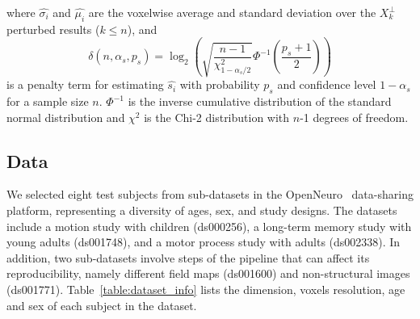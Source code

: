 \documentclass[lettersize,journal]{IEEEtran}
\begin{document}
{where $\hat{\sigma_i}$ and $\hat{\mu_i}$ are the voxelwise average and standard deviation over the $X_k^\perp$ perturbed results ($k \leq n$), and
\begin{equation}
  \delta(n, \alpha_s, p_s) = \log_2 \left( \sqrt{\frac{n-1}{\chi^2_{1-\alpha_s/2}}} \Phi^{-1} \left( \frac{p_s+1}{2} \right) \right)
\end{equation}
is a penalty term for estimating $\hat{s_i}$ with probability $p_s$ and confidence level $1-\alpha_s$ for a sample size $n$.
$\Phi^{-1}$ is the inverse cumulative distribution of the standard normal distribution and $\chi^2$ is the Chi-2 distribution with $n$-1 degrees of freedom.


\subsection{Data}
\label{subsec:data}

We selected eight test subjects from sub-datasets in the OpenNeuro~\cite{markiewicz2021openneuro} data-sharing platform, representing a diversity of ages, sex, and study designs. The datasets include a motion study with children (ds000256), a long-term memory study with young adults (ds001748), and a motor process study with adults (ds002338). In addition, two sub-datasets involve steps of the pipeline that can affect its reproducibility, namely different field maps (ds001600) and non-structural images (ds001771). Table~\ref{table:dataset_info} lists the dimension, voxels resolution, age and sex of each subject in the dataset.

}
\end{document}
